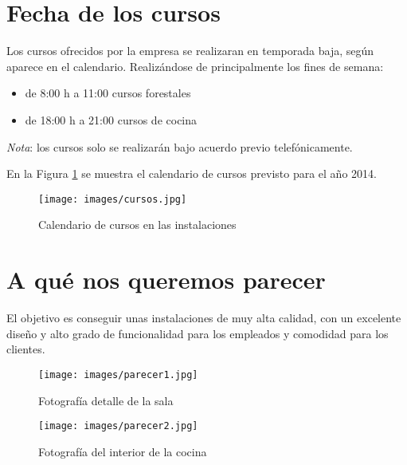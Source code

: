 \section{Fecha de los cursos}
\label{sec:cursos}

Los cursos ofrecidos por la empresa se realizaran en temporada baja, según aparece en el calendario.
Realizándose de principalmente los fines de semana:

\begin{itemize}
\item de 8:00 h a 11:00  cursos forestales
\item de 18:00 h a 21:00 cursos de cocina
\end{itemize}

\emph{Nota}: los cursos solo se realizarán bajo acuerdo previo telefónicamente.

En la Figura \ref{fig:cursos} se muestra el calendario de cursos previsto para el año 2014.

\begin{figure}[ht]
  \begin{center}
    \texttt{[image: images/cursos.jpg]}
    \caption{Calendario de cursos en las instalaciones}
    \label{fig:cursos}
  \end{center}
\end{figure}

\newpage
\section{A qué nos queremos parecer}
\label{sec:parecer}

El objetivo es conseguir unas instalaciones de muy alta calidad, con un excelente diseño y alto grado de funcionalidad para los empleados y comodidad para los clientes.

\begin{figure}[h]
  \begin{center}
    \texttt{[image: images/parecer1.jpg]}
    \caption{Fotografía detalle de la sala}
    \label{fig:parecer1}
  \end{center}
\end{figure}

\begin{figure}[ht]
  \begin{center}
    \texttt{[image: images/parecer2.jpg]}
    \caption{Fotografía del interior de la cocina}
    \label{fig:parecer2}
  \end{center}
\end{figure}
